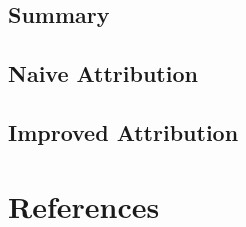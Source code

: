 \documentclass{article}
\begin{document}
\subsection{Summary}

\subsection{Naive Attribution}

\subsection{Improved Attribution}

\section{References}



\end{document}
